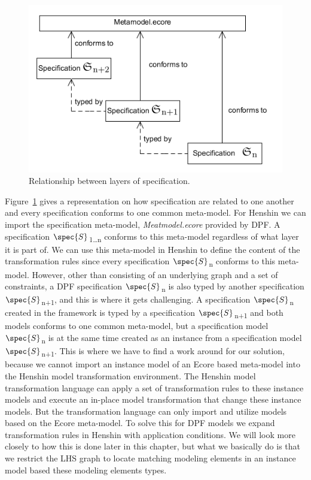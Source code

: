 \begin{figure}[H]
	\centering
	\includegraphics[scale=0.7]{./Figures/metamodelSpecification.png}
	\caption[Specification relationship with core meta-model]
	{Relationship between layers of specification.}
	\label{fig:core_metamodel}
\end{figure}

Figure~\ref{fig:core_metamodel} gives a representation on how specification
are related to one another and every specification conforms to one common
meta-model. For Henshin we can import the specification meta-model,
\textit{Meatmodel.ecore} provided by DPF. A specification
$\spec{S}$\textsubscript{1\ldots n} conforms to this meta-model regardless of
what layer it is part of. We can use this meta-model in Henshin to define the
content of the transformation rules since every specification
$\spec{S}$\textsubscript{n} conforms to this meta-model. However, other than
consisting of an underlying graph and a set of constraints, a DPF specification
$\spec{S}$\textsubscript{n} is also typed by another
specification$\spec{S}$\textsubscript{n+1}, and this is where it gets
challenging. A specification $\spec{S}$\textsubscript{n} created in the
framework is typed by a specification $\spec{S}$\textsubscript{n+1} and both
models conforms to one common meta-model, but a specification model
$\spec{S}$\textsubscript{n} is at the same time created as an instance from a
specification model $\spec{S}$\textsubscript{n+1}. This is where we have to
find a work around for our solution, because we cannot import an instance model
of an Ecore based meta-model into the Henshin model transformation environment.
The Henshin model transformation language can apply a set of transformation
rules to these instance models and execute an in-place model transformation
that change these instance models. But the transformation language can only
import and utilize models based on the Ecore meta-model. To solve this for DPF
models we expand transformation rules in Henshin with application conditions.
We will look more closely to how this is done later in this chapter, but what
we basically do is that we restrict the LHS graph to locate matching modeling
elements in an instance model based these modeling elements types.

